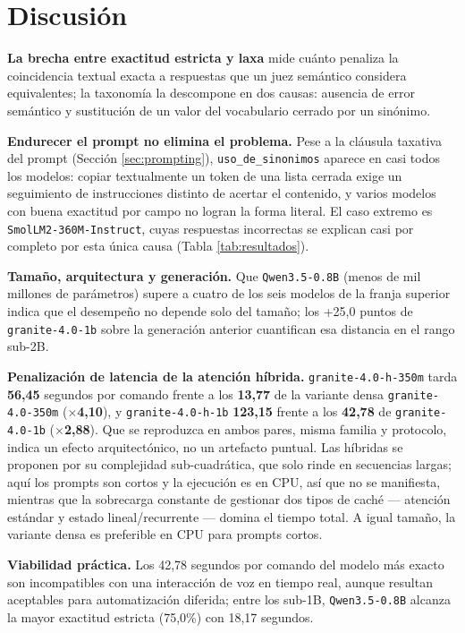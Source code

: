 \section{Discusión}
\label{sec:discusion}

\textbf{La brecha entre exactitud estricta y laxa} mide cuánto penaliza la
coincidencia textual exacta a respuestas que un juez semántico considera
equivalentes; la taxonomía la descompone en dos causas: ausencia de error
semántico y sustitución de un valor del vocabulario cerrado por un sinónimo.

\textbf{Endurecer el prompt no elimina el problema.} Pese a la cláusula
taxativa del prompt (Sección \ref{sec:prompting}), \texttt{uso\_de\_sinonimos}
aparece en casi todos los modelos: copiar textualmente un token de una lista
cerrada exige un seguimiento de instrucciones distinto de acertar el
contenido, y varios modelos con buena exactitud por campo no logran la forma
literal. El caso extremo es \texttt{SmolLM2-360M-Instruct}, cuyas respuestas
incorrectas se explican casi por completo por esta única causa (Tabla
\ref{tab:resultados}).

\textbf{Tamaño, arquitectura y generación.} Que \texttt{Qwen3.5-0.8B} (menos
de mil millones de parámetros) supere a cuatro de los seis modelos de la
franja superior indica que el desempeño no depende solo del tamaño; los
+25,0 puntos de \texttt{granite-4.0-1b} sobre la generación anterior
cuantifican esa distancia en el rango sub-2B.

\textbf{Penalización de latencia de la atención híbrida.}
\label{sec:discusion-latencia-hibrida}
\texttt{granite-4.0-h-350m} tarda \textbf{56,45} segundos por comando frente
a los \textbf{13,77} de la variante densa \texttt{granite-4.0-350m}
(\textbf{$\times$4,10}), y \texttt{granite-4.0-h-1b} \textbf{123,15} frente a
los \textbf{42,78} de \texttt{granite-4.0-1b} (\textbf{$\times$2,88}). Que se
reproduzca en ambos pares, misma familia y protocolo, indica un efecto
arquitectónico, no un artefacto puntual. Las híbridas se proponen por su
complejidad sub-cuadrática, que solo rinde en secuencias largas; aquí los
prompts son cortos y la ejecución es en CPU, así que no se manifiesta,
mientras que la sobrecarga constante
de gestionar dos tipos de caché — atención estándar y estado
lineal/recurrente — domina el tiempo total. A igual tamaño, la variante densa
es preferible en CPU para prompts cortos.

\textbf{Viabilidad práctica.} Los 42,78 segundos por comando del modelo más
exacto son incompatibles con una interacción de voz en tiempo real, aunque
resultan aceptables para automatización diferida; entre los sub-1B,
\texttt{Qwen3.5-0.8B} alcanza la mayor exactitud estricta (75,0\%) con 18,17
segundos.
